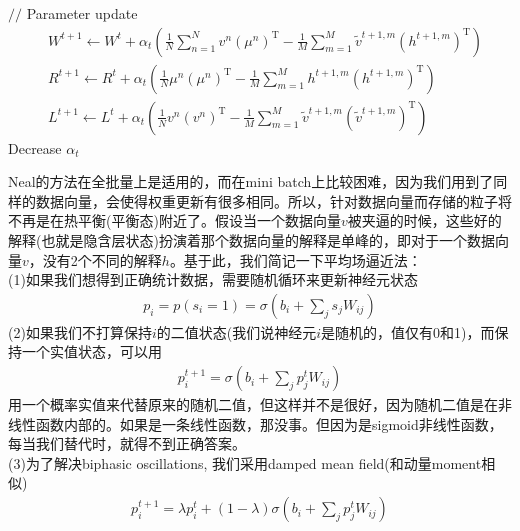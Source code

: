 {\begin{algorithm}[htbp]
\begin{algorithmic}[1]
                        \EndFor
                        \State $//$ Parameter update
                        \begin{align*}
                        & W^{t+1} \leftarrow W^t + \alpha_t \left( \frac{1}{N}\sum_{n=1}^Nv^n (\mu^n)^\mathrm{T} - \frac{1}{M} \sum_{m=1}^M \tilde{v}^{t+1,m} (h^{t+1,m})^\mathrm{T}\right)\\
                        & R^{t+1} \leftarrow R^t + \alpha_t \left( \frac{1}{N} \mu^n(\mu^n)^\mathrm{T} - \frac{1}{M} \sum_{m=1}^M h^{t+1,m} (h^{t+1,m})^\mathrm{T} \right)\\
                        & L^{t+1} \leftarrow L^t + \alpha_t \left( \frac{1}{N} v^n(v^n)^\mathrm{T} - \frac{1}{M} \sum_{m=1}^M \tilde{v}^{t+1,m} (\tilde{v}^{t+1,m})^\mathrm{T} \right)
                        \end{align*}
                        \State Decrease $\alpha_t$
                    \EndFor
                \end{algorithmic}
            \end{algorithm}
            \par
            Neal的方法在全批量上是适用的，而在mini batch上比较困难，因为我们用到了同样的数据向量，会使得权重更新有很多相同。所以，针对数据向量而存储的粒子将不再是在热平衡(平衡态)附近了。假设当一个数据向量$v$被夹逼的时候，这些好的解释(也就是隐含层状态)扮演着那个数据向量的解释是单峰的，即对于一个数据向量$v$，没有2个不同的解释$h$。基于此，我们简记一下平均场逼近法：\\
            (1)如果我们想得到正确统计数据，需要随机循环来更新神经元状态
            \begin{align*}
            p_i = p(s_i = 1) = \sigma\left(b_i + \sum_j s_j W_{ij}\right)
            \end{align*}
            (2)如果我们不打算保持$i$的二值状态(我们说神经元$i$是随机的，值仅有0和1)，而保持一个实值状态，可以用
            \begin{align*}
            p_i^{t+1} = \sigma\left(b_i + \sum_j p_j^t W_{ij}\right)
            \end{align*}
            用一个概率实值来代替原来的随机二值，但这样并不是很好，因为随机二值是在非线性函数内部的。如果是一条线性函数，那没事。但因为是sigmoid非线性函数，每当我们替代时，就得不到正确答案。\\
            (3)为了解决biphasic oscillations, 我们采用damped mean field(和动量moment相似)
            \begin{align*}
            p_i^{t+1} = \lambda p_i^t + (1-\lambda)\sigma\left(b_i + \sum_j p_j^t W_{ij}\right)
            \end{align*}

}
